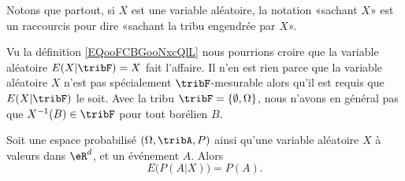 Notons que partout, si \( X\) est une variable aléatoire, la notation «sachant \( X\)» est un raccourcis pour dire «sachant la tribu engendrée par \( X\)».

\begin{normaltext}      \label{NORMooHPHOooUuJWHR}
    Vu la définition \ref{EQooFCBGooNxcQlL} nous pourrions croire que la variable aléatoire \( E(X|\tribF)=X\) fait l'affaire. Il n'en est rien parce que la variable aléatoire \( X\) n'est pas spécialement \( \tribF\)-mesurable alors qu'il est requis que \( E(X|\tribF)\) le soit. Avec la tribu \( \tribF=\{ \emptyset,\Omega \}\), nous n'avons en général pas que \( X^{-1}(B)\in \tribF\) pour tout borélien \( B\).
\end{normaltext}

\begin{proposition}
    Soit une espace probabilisé \( (\Omega,\tribA,P)\) ainsi qu'une variable aléatoire \( X\) à valeurs dans \( \eR^d\), et un événement \( A\). Alors
    \begin{equation}
        E\big( P(A|X) \big)=P(A).
    \end{equation}
\end{proposition}

